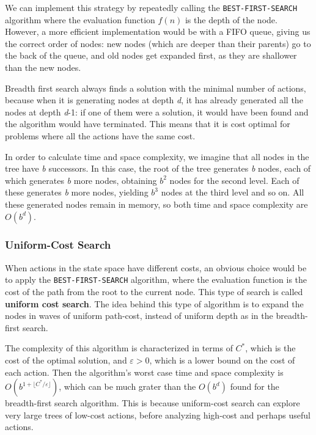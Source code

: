 \documentclass{article}
\begin{document}
We can implement this strategy by repeatedly calling the \lstinline{BEST-FIRST-SEARCH} algorithm where the evaluation function $f(n)$ is the depth of the node. However, a more efficient implementation would be with a FIFO queue, giving us the correct order of nodes: new nodes (which are deeper than their parents) go to the back of the queue, and old nodes get expanded first, as they are shallower than the new nodes.

Breadth first search always finds a solution with the minimal number of actions, because when it is generating nodes at depth \textit{d}, it has already generated all the nodes at depth \textit{d}-1: if one of them were a solution, it would have been found and the algorithm would have terminated. This means that it is cost optimal for problems where all the actions have the same cost.

In order to calculate time and space complexity, we imagine that all nodes in the tree have \textit{b} successors. In this case, the root of the tree generates \textit{b} nodes, each of which generates \textit{b} more nodes, obtaining $b^2$ nodes for the second level. Each of these generates \textit{b} more nodes, yielding $b^3$ nodes at the third level and so on. All these generated nodes remain in memory, so both time and space complexity are $O(b^d)$.

\subsubsection{Uniform-Cost Search}
When actions in the state space have different costs, an obvious choice would be to apply the \lstinline{BEST-FIRST-SEARCH} algorithm, where the evaluation function is the cost of the path from the root to the current node. This type of search is called \textbf{uniform cost search}. The idea behind this type of algorithm is to expand the nodes in waves of uniform path-cost, instead of uniform depth as in the breadth-first search.

The complexity of this algorithm is characterized in terms of $C^*$, which is the cost of the optimal solution, and $\varepsilon > 0$, which is a lower bound on the cost of each action. Then the algorithm's worst case time and space complexity is $O(b^{1+\lfloor C^*/\varepsilon \rfloor})$, which can be much grater than the $O(b^d)$ found for the breadth-first search algorithm. This is because uniform-cost search can explore very large trees of low-cost actions, before analyzing high-cost and perhaps useful actions.
\end{document}
